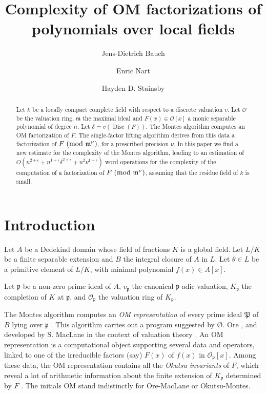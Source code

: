 \documentclass{amsart}
\title[Complexity of OM factorizations]{Complexity of OM factorizations of polynomials over local fields}
\author[Bauch]{Jens-Dietrich Bauch}
\author[Nart]{Enric Nart}
\author[Stainsby]{Hayden D. Stainsby}
\date{}
\begin{document}
\begin{abstract}
Let $k$ be a locally compact complete field with respect to a discrete valuation $v$. Let ${\mathcal{O}}$ be the valuation ring, ${{\mathfrak m}}$ the maximal ideal and $F(x)\in{\mathcal{O}}[x]$ a monic separable polynomial of degree $n$. Let $\delta=v({\operatorname{Disc}}(F))$. The Montes algorithm  computes an OM factorization of $F$. The single-factor lifting algorithm derives from this data a factorization of $F {\; \mbox{\rm(mod }{{{{\mathfrak m}}^\nu}})}$, for a prescribed precision $\nu$. In this paper we find a new estimate for the complexity of the Montes algorithm, leading to an estimation of $O\left(n^{2+\epsilon}+n^{1+\epsilon}\delta^{2+\epsilon}+n^2\nu^{1+\epsilon}\right)$ word operations for the complexity of the computation of a factorization of $F {\; \mbox{\rm(mod }{{{{\mathfrak m}}^\nu}})}$, assuming that the residue field of $k$ is small. 
\end{abstract}

\maketitle
\section*{Introduction}
Let $A$ be a Dedekind domain whose field of fractions $K$ is a global field. Let $L/K$ be a finite separable extension and $B$ the integral closure of $A$ in $L$. Let ${\theta}\in L$ be a primitive element of $L/K$, with minimal polynomial $f(x)\in A[x]$.

Let ${\mathfrak{p}}$ be a non-zero prime ideal of $A$, $v_{\mathfrak{p}}$ the canonical ${\mathfrak{p}}$-adic valuation, $K_{\mathfrak{p}}$ the completion of $K$ at ${\mathfrak{p}}$, and ${\mathcal{O}}_{\mathfrak{p}}$ the valuation ring of $K_{\mathfrak{p}}$.

The Montes algorithm \cite{algorithm,HN} computes an \emph{OM representation} of every prime ideal ${\mathfrak{P}}$ of $B$ lying over ${\mathfrak{p}}$ \cite{newapp}. This algorithm carries out a program suggested by \O. Ore \cite{ore1,ore2}, and developed by S. MacLane in the context of valuation theory \cite{mcla,mclb}. An OM representation is a computational object supporting several data and operators, linked to one of the irreducible factors (say) $F(x)$ of $f(x)$ in ${\mathcal{O}}_{\mathfrak{p}}[x]$. Among these data, the OM representation contains all the \emph{Okutsu invariants} of $F$, which reveal a lot of arithmetic information about the finite extension of $K_{\mathfrak{p}}$ determined by $F$ \cite{Ok,okutsu}. The initials OM stand indistinctly for Ore-MacLane or Okutsu-Montes. 
\end{document}
